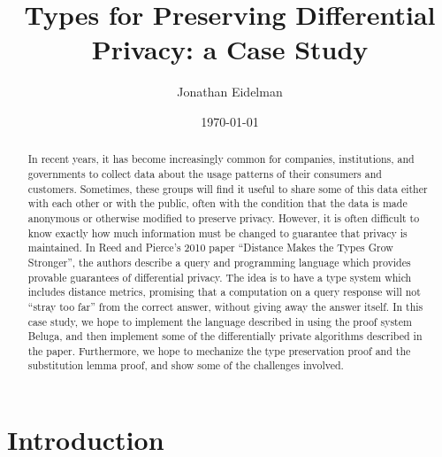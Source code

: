 \documentclass[11pt]{article}
\begin{document}
\title{Types for Preserving Differential Privacy: a Case Study}
\author{Jonathan Eidelman}
\date{\today}
\maketitle

\begin{abstract}
  In recent years, it has become increasingly common for companies, institutions, and governments to collect data about the usage patterns of their consumers and customers. Sometimes, these groups will find it useful to share some of this data either with each other or with the public, often with the condition that the data is made anonymous or otherwise modified to preserve privacy. However, it is often difficult to know exactly how much information must be changed to guarantee that privacy is maintained. In Reed and Pierce's 2010 paper ``Distance Makes the Types Grow Stronger'', the authors describe a query and programming language which provides provable guarantees of differential privacy\cite{reed2010}. The idea is to have a type system which includes distance metrics, promising that a computation on a query response will not ``stray too far'' from the correct answer, without giving away the answer itself. In this case study, we hope to implement the language described in \cite{reed2010} using the proof system Beluga, and then implement some of the differentially private algorithms described in the paper. Furthermore, we hope to mechanize the type preservation proof and the substitution lemma proof, and show some of the challenges involved.
\end{abstract}



\section{Introduction}
\end{document}
